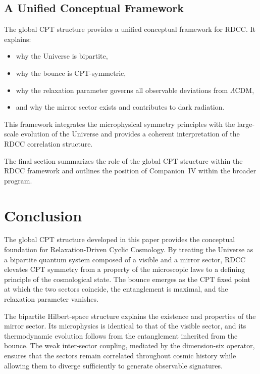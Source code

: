 \documentclass[11pt,a4paper]{article}
\begin{document}
\subsection{A Unified Conceptual Framework}

The global CPT structure provides a unified conceptual framework for RDCC. It explains:
\begin{itemize}
    \item why the Universe is bipartite,
    \item why the bounce is CPT-symmetric,
    \item why the relaxation parameter governs all observable deviations from $\Lambda$CDM,
    \item and why the mirror sector exists and contributes to dark radiation.
\end{itemize}
This framework integrates the microphysical symmetry principles with the large-scale evolution of the Universe and provides a coherent interpretation of the RDCC correlation structure.

The final section summarizes the role of the global CPT structure within the RDCC framework and outlines the position of Companion~IV within the broader program.


\section{Conclusion}

The global CPT structure developed in this paper provides the conceptual foundation for Relaxation-Driven Cyclic Cosmology. By treating the Universe as a bipartite quantum system composed of a visible and a mirror sector, RDCC elevates CPT symmetry from a property of the microscopic laws to a defining principle of the cosmological state. The bounce emerges as the CPT fixed point at which the two sectors coincide, the entanglement is maximal, and the relaxation parameter vanishes.

The bipartite Hilbert-space structure explains the existence and properties of the mirror sector. Its microphysics is identical to that of the visible sector, and its thermodynamic evolution follows from the entanglement inherited from the bounce. The weak inter-sector coupling, mediated by the dimension-six operator, ensures that the sectors remain correlated throughout cosmic history while allowing them to diverge sufficiently to generate observable signatures.
\end{document}
